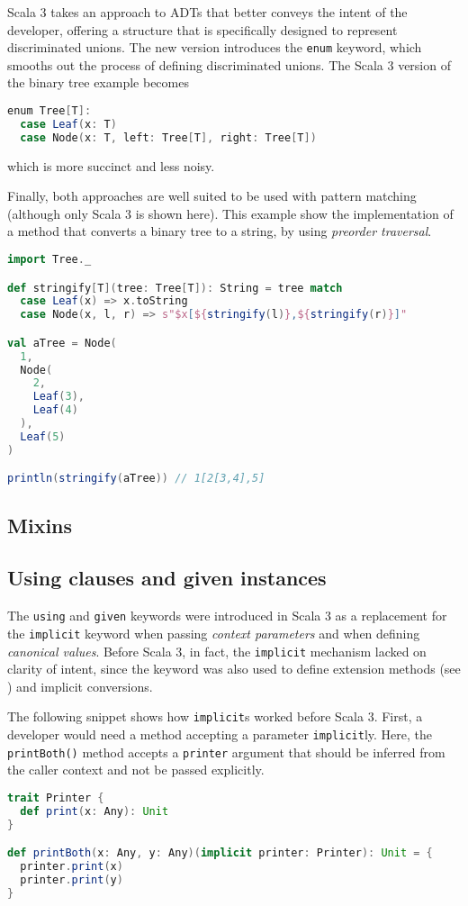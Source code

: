 Scala 3 takes an approach to ADTs that better conveys the intent of the developer, offering a structure that is specifically designed to represent discriminated unions.
%
The new version introduces the \texttt{enum} keyword, which smooths out the process of defining discriminated unions.
%
The Scala 3 version of the binary tree example becomes
%
\begin{lstlisting}[frame=single, language=scala]
enum Tree[T]:
  case Leaf(x: T)
  case Node(x: T, left: Tree[T], right: Tree[T])
\end{lstlisting}
%
which is more succinct and less noisy.

Finally, both approaches are well suited to be used with pattern matching (although only Scala 3 is shown here).
%
This example show the implementation of a method that converts a binary tree to a string, by using \textit{preorder traversal}.
%
\begin{lstlisting}[frame=single, language=scala]
import Tree._

def stringify[T](tree: Tree[T]): String = tree match
  case Leaf(x) => x.toString
  case Node(x, l, r) => s"$x[${stringify(l)},${stringify(r)}]"

val aTree = Node(
  1,
  Node(
    2,
    Leaf(3),
    Leaf(4)
  ),
  Leaf(5)
)

println(stringify(aTree)) // 1[2[3,4],5]
\end{lstlisting}

\subsection{Mixins}

\subsection{Using clauses and given instances}
\label{sec:given-using}

The \texttt{using} and \texttt{given} keywords were introduced in Scala 3 as a replacement for the \texttt{implicit} keyword when passing \textit{context parameters} and when defining \textit{canonical values}.
%
Before Scala 3, in fact, the \texttt{implicit} mechanism lacked on clarity of intent, since the keyword was also used to define extension methods (see ) and implicit conversions.

The following snippet shows how \texttt{implicit}s worked before Scala 3.
%
First, a developer would need a method accepting a parameter \texttt{implicit}ly.
%
Here, the \texttt{printBoth()} method accepts a \texttt{printer} argument that should be inferred from the caller context and not be passed explicitly.
%
\begin{lstlisting}[frame=single, language=scala]
trait Printer {
  def print(x: Any): Unit
}

def printBoth(x: Any, y: Any)(implicit printer: Printer): Unit = {
  printer.print(x)
  printer.print(y)
}
\end{lstlisting}


